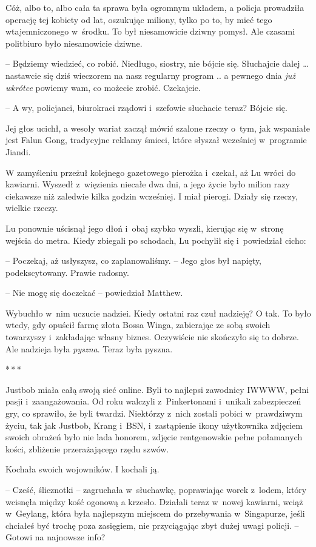 \documentclass[oneside,polish,11pt,rmheadings]{mwbk}
\newcommand{\threeast}{\par\centerline{*\,*\,*}\medskip\par}
\begin{document}
Cóż, albo to, albo cała ta sprawa była ogromnym układem, a policja prowadziła operację tej kobiety od lat, oszukując miliony, tylko po to, by mieć tego wtajemniczonego w~środku. To był niesamowicie dziwny pomysł. Ale czasami politbiuro było niesamowicie dziwne.

-- Będziemy wiedzieć, co robić. Niedługo, siostry, nie bójcie się. Słuchajcie dalej  \ldots  nastawcie się dziś wieczorem na nasz regularny program .. a pewnego dnia \textit{już wkrótce }powiemy wam, co możecie zrobić. Czekajcie.

-- A wy, policjanci, biurokraci rządowi i~szefowie słuchacie teraz? Bójcie się.

Jej głos ucichł, a wesoły wariat zaczął mówić szalone rzeczy o~tym, jak wspaniałe jest Falun Gong, tradycyjne reklamy śmieci, które słyszał wcześniej w~programie Jiandi.

W zamyśleniu przeżuł kolejnego gazetowego pierożka i~czekał, aż Lu wróci do kawiarni. Wyszedł z~więzienia niecałe dwa dni, a jego życie było milion razy ciekawsze niż zaledwie kilka godzin wcześniej. I miał pierogi. Działy się rzeczy, wielkie rzeczy.

Lu ponownie uścisnął jego dłoń i~obaj szybko wyszli, kierując się w~stronę wejścia do metra. Kiedy zbiegali po schodach, Lu pochylił się i~powiedział cicho: 

-- Poczekaj, aż usłyszysz, co zaplanowaliśmy. -- Jego głos był napięty, podekscytowany. Prawie radosny.

-- Nie mogę się doczekać -- powiedział Matthew.

Wybuchło w~nim uczucie nadziei. Kiedy ostatni raz czuł nadzieję? O tak. To było wtedy, gdy opuścił farmę złota Bossa Winga, zabierając ze sobą swoich towarzyszy i~zakładając własny biznes. Oczywiście nie skończyło się to dobrze. Ale nadzieja była \textit{pyszna}. Teraz była pyszna.

\bigskip
\threeast

Justbob miała całą swoją sieć online. Byli to najlepsi zawodnicy IWWWW, pełni pasji i~zaangażowania. Od roku walczyli z~Pinkertonami i~unikali zabezpieczeń gry, co sprawiło, że byli twardzi. Niektórzy z~nich zostali pobici w~prawdziwym życiu, tak jak Justbob, Krang i~BSN, i~zastąpienie ikony użytkownika zdjęciem swoich obrażeń było nie lada honorem, zdjęcie rentgenowskie pełne połamanych kości, zbliżenie przerażającego rzędu szwów.

Kochała swoich wojowników. I kochali ją.

-- Cześć, ślicznotki -- zagruchała w~słuchawkę, poprawiając worek z~lodem, który wcisnęła między kość ogonową a krzesło. Działali teraz w~nowej kawiarni, wciąż w~Geylang, która była najlepszym miejscem do przebywania w~Singapurze, jeśli chciałeś być trochę poza zasięgiem, nie przyciągając zbyt dużej uwagi policji. -- Gotowi na najnowsze info? 
\end{document}
